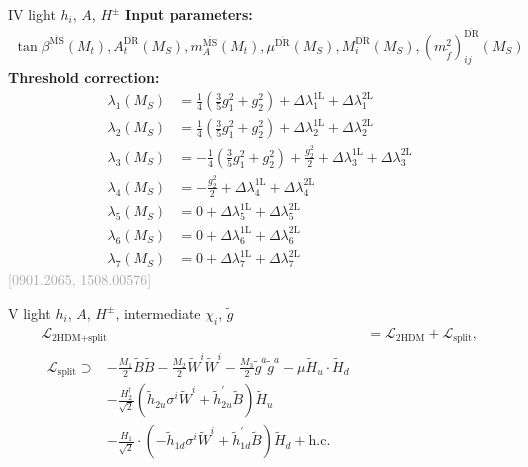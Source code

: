 \documentclass[hyperref={pdfpagelabels=false},ngerman]{beamer}
\newcommand{\MS}{\ensuremath{M_S}}
\newcommand{\bigcite}[1]{\textcolor{darkgray}{[#1]}}
\renewcommand{\emph}{\textbf}
\newcommand{\DRbar}{\ensuremath{\overline{\text{DR}}}}
\newcommand{\MSbar}{\ensuremath{\overline{\text{MS}}}}
\newcommand{\SplitTHDM}{\ensuremath{\text{2HDM+split}}\xspace}
\newcommand{\THDM}{\ensuremath{\text{2HDM}}\xspace}
\newcommand{\hc}{\ensuremath{\text{h.c.}}}
\newcommand{\Lag}{\ensuremath{\mathcal{L}}}
\newcommand{\DlTHDM}[2]{\Delta\lambda_{#1}^{\text{#2L}}}
\newcommand{\gSplitTHDM}[1]{\ensuremath{\tilde{h}_{#1}}}
\newcommand{\gpSplitTHDM}[1]{\ensuremath{\tilde{h}_{#1}^{\prime}}}
\begin{document}
\begin{frame}[noframenumbering]{IV light $h_i$, $A$, $H^{\pm}$}
  \emph{Input parameters:}
  \begin{align*}
  \tan\beta^{\MSbar}(M_t), A_t^{\DRbar}(\MS), m_A^{\MSbar}(M_t),
  \mu^{\DRbar}(\MS), M_i^{\DRbar}(\MS),
  (m_{\tilde{f}}^2)^{\DRbar}_{ij}(\MS)
  \end{align*}
  \emph{Threshold correction:}
  \begin{align*}
    \lambda_1(\MS) &= \frac{1}{4}\left(\frac{3}{5} g_1^2 + g_2^2\right) + \DlTHDM{1}{1} + \DlTHDM{1}{2}\\
    \lambda_2(\MS) &= \frac{1}{4}\left(\frac{3}{5} g_1^2 + g_2^2\right) + \DlTHDM{2}{1} + \DlTHDM{2}{2}\\
    \lambda_3(\MS) &= -\frac{1}{4} \left(\frac{3}{5}g_1^2 + g_2^2\right) + \frac{g_2^2}{2} + \DlTHDM{3}{1} + \DlTHDM{3}{2}\\
    \lambda_4(\MS) &= -\frac{g_2^2}{2} + \DlTHDM{4}{1} + \DlTHDM{4}{2}\\
    \lambda_5(\MS) &= 0 + \DlTHDM{5}{1} + \DlTHDM{5}{2}\\
    \lambda_6(\MS) &= 0 + \DlTHDM{6}{1} + \DlTHDM{6}{2}\\
    \lambda_7(\MS) &= 0 + \DlTHDM{7}{1} + \DlTHDM{7}{2}
  \end{align*}
  \hfill\bigcite{0901.2065, 1508.00576}
\end{frame}

\begin{frame}[noframenumbering]{V light $h_i$, $A$, $H^{\pm}$, intermediate $\chi_i$, $\tilde{g}$}
\begin{align*}
  \Lag_{\SplitTHDM} &= \Lag_{\THDM} + \Lag_\text{split}, \\
\begin{split}
  \Lag_\text{split} \supset
  &- \frac{M_1}{2} \tilde{B}\tilde{B}
  - \frac{M_2}{2} \tilde{W}^i\tilde{W}^i
  - \frac{M_3}{2} \tilde{g}^a\tilde{g}^a
  - \mu \tilde{H}_u\cdot \tilde{H}_d \\
  &-\frac{H_2^\dagger}{\sqrt{2}} \left( \gSplitTHDM{2u} \sigma^i\tilde{W}^i
     +\gpSplitTHDM{2u} \tilde{B} \right)\tilde{H}_u \\
  &-\frac{H_1}{\sqrt{2}} \cdot  \left( -\gSplitTHDM{1d} \sigma^i\tilde{W}^i
     + \gpSplitTHDM{1d} \tilde{B} \right) \tilde{H}_d
  + \hc
\end{split}
\end{align*}
\end{frame}
\end{document}
